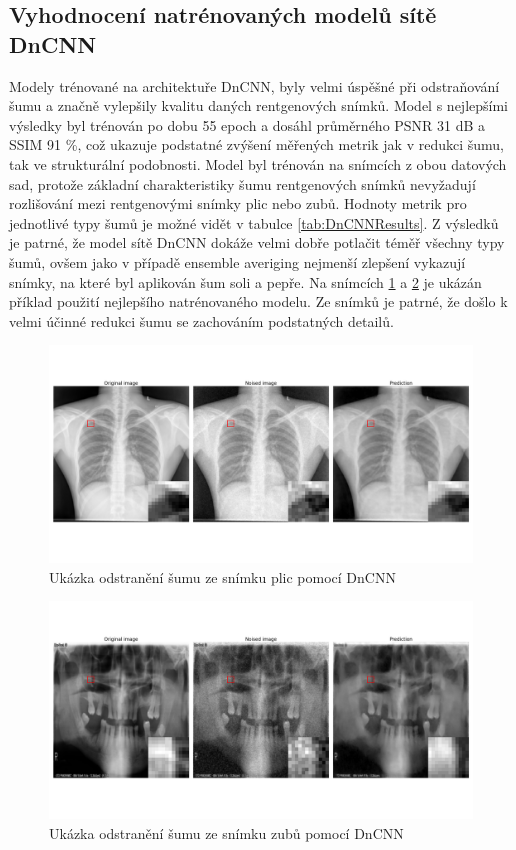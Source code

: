 \documentclass[male,czech,api_ing]{thesis}
\begin{document}
\subsection{Vyhodnocení natrénovaných modelů sítě DnCNN}
Modely trénované na architektuře DnCNN, byly velmi úspěšné při odstraňování šumu a značně vylepšily kvalitu daných rentgenových snímků. Model s nejlepšími výsledky byl trénován po dobu 55 epoch a dosáhl průměrného PSNR 31 dB a SSIM 91 \%, což ukazuje podstatné zvýšení měřených metrik jak v redukci šumu, tak ve strukturální podobnosti. Model byl trénován na snímcích z obou datových sad, protože základní charakteristiky šumu rentgenových snímků nevyžadují rozlišování mezi rentgenovými snímky plic nebo zubů. Hodnoty metrik pro jednotlivé typy šumů je možné vidět v tabulce \ref{tab:DnCNNResults}. Z výsledků je patrné, že model sítě DnCNN dokáže velmi dobře potlačit téměř všechny typy šumů, ovšem jako v případě ensemble averiging nejmenší zlepšení vykazují snímky, na které byl aplikován šum soli a pepře. Na snímcích \ref{fig:DnCNN_lungs} a \ref{fig:DnCNN_teeth} je ukázán příklad použití nejlepšího natrénovaného modelu. Ze snímků je patrné, že došlo k velmi účinné redukci šumu se zachováním podstatných detailů.

\begin{figure}[h]
    \centering
    \includegraphics[width=\linewidth]{Prilohy/Obrazky/DnCNN_lungs.png}
    \caption{Ukázka odstranění šumu ze snímku plic pomocí DnCNN}
    \label{fig:DnCNN_lungs}
\end{figure}

\begin{figure}[h]
    \centering
    \includegraphics[width=\linewidth]{Prilohy/Obrazky/DnCNN_teeth.png}
    \caption{Ukázka odstranění šumu ze snímku zubů pomocí DnCNN}
    \label{fig:DnCNN_teeth}
\end{figure}
\end{document}
